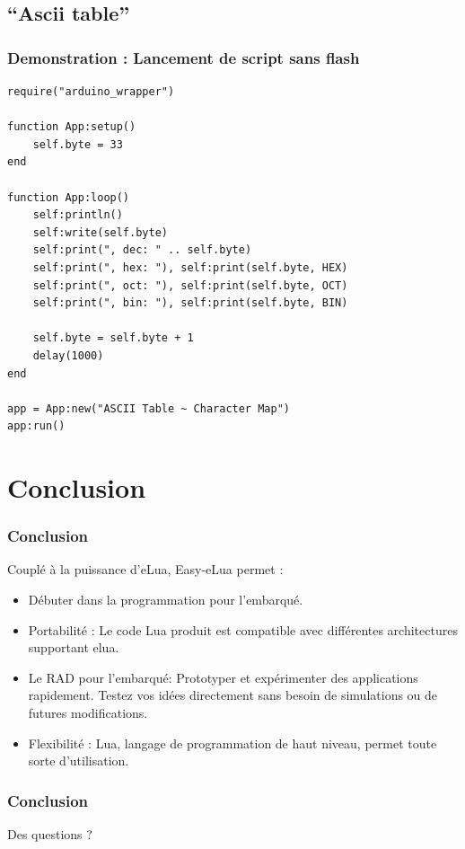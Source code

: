 \documentclass{beamer}
\begin{document}
\subsection{``Ascii table''}
\begin{frame}[containsverbatim]
\frametitle{Demonstration : Lancement de script sans flash}
\tiny{\begin{lstlisting}
require("arduino_wrapper")

function App:setup()
    self.byte = 33
end

function App:loop()
    self:println()
    self:write(self.byte)
    self:print(", dec: " .. self.byte)
    self:print(", hex: "), self:print(self.byte, HEX)
    self:print(", oct: "), self:print(self.byte, OCT)
    self:print(", bin: "), self:print(self.byte, BIN)

    self.byte = self.byte + 1
    delay(1000)
end

app = App:new("ASCII Table ~ Character Map")
app:run()

\end{lstlisting}}
\end{frame}

\section{Conclusion}
\begin{frame}
\frametitle{Conclusion}
Couplé à la puissance d'eLua, Easy-eLua permet :
\begin{itemize}
\item Débuter dans la programmation pour l'embarqué.
\item Portabilité : Le code Lua produit est compatible avec différentes architectures supportant elua.
\item Le RAD pour l'embarqué: Prototyper et expérimenter des applications rapidement. Testez vos idées directement sans besoin de simulations ou de futures modifications.
\item Flexibilité : Lua, langage de programmation de haut niveau, permet toute sorte d'utilisation.
\end{itemize}
\end{frame}

\begin{frame}
\frametitle{Conclusion}
\begin{center}
\huge{Des questions ?}
\end{center}
\end{frame}
\end{document}
